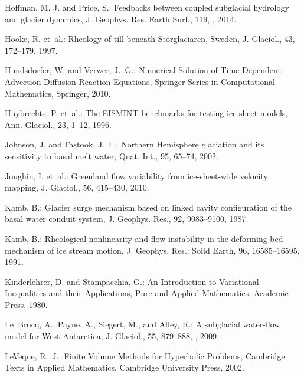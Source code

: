 \documentclass[gmd]{copernicus}   %
\begin{document}
\begin{thebibliography}{}
Hoffman, M. J. and Price, S.: Feedbacks between coupled subglacial hydrology and glacier dynamics, J. Geophys. Res. Earth Surf., 119, , 2014.

Hooke, R. et~al.: Rheology of
  till beneath {S}t\"orglaciaren, {S}weden, J. Glaciol., 43, 172--179, 1997.

Hundsdorfer, W. and Verwer, J.~G.: Numerical {S}olution of {T}ime-{D}ependent
  {A}dvection-{D}iffusion-{R}eaction {E}quations, Springer Series in
  Computational Mathematics, Springer, 2010.

Huybrechts, P. et~al.: The {EISMINT} benchmarks for testing ice-sheet models,
  Ann. Glaciol., 23, 1--12, 1996.

Johnson, J. and Fastook, J.~L.: Northern {H}emisphere glaciation and its
  sensitivity to basal melt water, Quat. Int., 95, 65--74, 2002.

Joughin, I. et~al.: Greenland flow variability from ice-sheet-wide velocity
  mapping, J. Glaciol., 56, 415--430, 2010.

Kamb, B.: Glacier surge mechanism based on linked cavity configuration of the
  basal water conduit system, J. Geophys. Res., 92, 9083--9100, 1987.

Kamb, B.: Rheological nonlinearity and flow instability in the deforming bed
  mechanism of ice stream motion, J. Geophys. Res.: Solid Earth, 96, 16585--16595, 1991.

Kinderlehrer, D. and Stampacchia, G.: An {I}ntroduction to {V}ariational
  {I}nequalities and their {A}pplications, Pure and Applied Mathematics,
  Academic Press, 1980.

Le~Brocq, A., Payne, A., Siegert, M., and Alley, R.: A subglacial water-flow
  model for {W}est {A}ntarctica, J. Glaciol., 55, 879--888,
  , 2009.

LeVeque, R.~J.: Finite Volume Methods for Hyperbolic Problems, Cambridge Texts
  in Applied Mathematics, Cambridge University Press, 2002.


\end{thebibliography}
\end{document}
